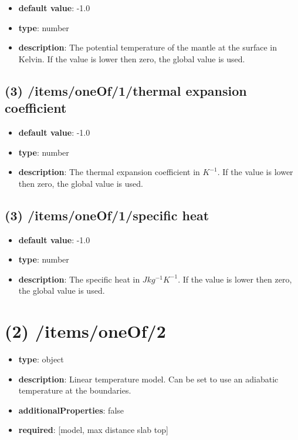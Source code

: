 \begin{itemize}[leftmargin=3em]\item {\bf default value}: -1.0
\item {\bf type}: number
\item {\bf description}: The potential temperature of the mantle at the surface in Kelvin. If the value is lower then zero, the global value is used.
\end{itemize}\subsection{(3) /items/oneOf/1/thermal expansion coefficient}
\begin{itemize}[leftmargin=3em]\item {\bf default value}: -1.0
\item {\bf type}: number
\item {\bf description}: The thermal expansion coefficient in $K^{-1}$. If the value is lower then zero, the global value is used.
\end{itemize}\subsection{(3) /items/oneOf/1/specific heat}
\begin{itemize}[leftmargin=3em]\item {\bf default value}: -1.0
\item {\bf type}: number
\item {\bf description}: The specific heat in $J kg^{-1} K^{-1}$. If the value is lower then zero, the global value is used.
\end{itemize}\section{(2) /items/oneOf/2}
\begin{itemize}[leftmargin=2em]\item {\bf type}: object
\item {\bf description}: Linear temperature model. Can be set to use an adiabatic temperature at the boundaries.
\item {\bf additionalProperties}: false
\item {\bf required}: [model, max distance slab top]\end{itemize}
